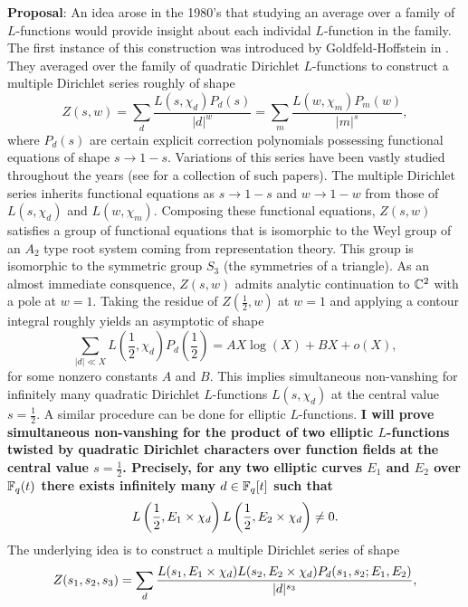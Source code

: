 \documentclass[12pt,reqno,oneside]{amsart}
\begin{document}
\textbf{Proposal}: An idea arose in the 1980's that studying an average over a family of $L$-functions would provide insight about each individal $L$-function in the family. The first instance of this construction was introduced by Goldfeld-Hoffstein in \cite{GH}. They averaged over the family of quadratic Dirichlet $L$-functions to construct a multiple Dirichlet series roughly of shape
\[
  Z(s,w) = \sum_{d}\frac{L(s,\chi_{d})P_{d}(s)}{|d|^{w}} = \sum_{m}\frac{L(w,\chi_{m})P_{m}(w)}{|m|^{s}},
\]
where $P_{d}(s)$ are certain explicit correction polynomials possessing functional equations of shape $s \to 1-s$. Variations of this series have been vastly studied throughout the years (see \cite{BW} for a collection of such papers). The multiple Dirichlet series inherits functional equations as $s \to 1-s$ and $w \to 1-w$ from those of $L(s,\chi_{d})$ and $L(w,\chi_{m})$. Composing these functional equations, $Z(s,w)$ satisfies a group of functional equations that is isomorphic to the Weyl group of an $A_{2}$ type root system coming from representation theory. This group is isomorphic to the symmetric group $S_{3}$ (the symmetries of a triangle). As an almost immediate consquence, $Z(s,w)$ admits analytic continuation to $\mathbb{C}^{2}$ with a pole at $w = 1$. Taking the residue of $Z\left(\frac{1}{2},w\right)$ at $w = 1$ and applying a contour integral roughly yields an asymptotic of shape
\[
  \sum_{|d| \ll X}L\left(\frac{1}{2},\chi_{d}\right)P_{d}\left(\frac{1}{2}\right) = AX\log(X)+BX+o(X),
\]
for some nonzero constants $A$ and $B$. This implies simultaneous non-vanshing for infinitely many quadratic Dirichlet $L$-functions $L(s,\chi_{d})$ at the central value $s = \frac{1}{2}$. A similar procedure can be done for elliptic $L$-functions. \textbf{I will prove simultaneous non-vanshing for the product of two elliptic $L$-functions twisted by quadratic Dirichlet characters over function fields at the central value $s = \frac{1}{2}$. Precisely, for any two elliptic curves $E_{1}$ and $E_{2}$ over $\mathbb{F}_{q}(t)$ there exists infinitely many $d \in \mathbb{F}_{q}[t]$ such that
\[
  L\left(\frac{1}{2},E_{1} \times \chi_{d}\right)L\left(\frac{1}{2},E_{2} \times \chi_{d}\right) \neq 0.
\]}
The underlying idea is to construct a multiple Dirichlet series of shape
\[
  Z(s_{1},s_{2},s_{3}) = \sum_{d}\frac{L(s_{1},E_{1} \times \chi_{d})L(s_{2},E_{2} \times \chi_{d})P_{d}(s_{1},s_{2};E_{1},E_{2})}{|d|^{s_{3}}},
\]
\end{document}
